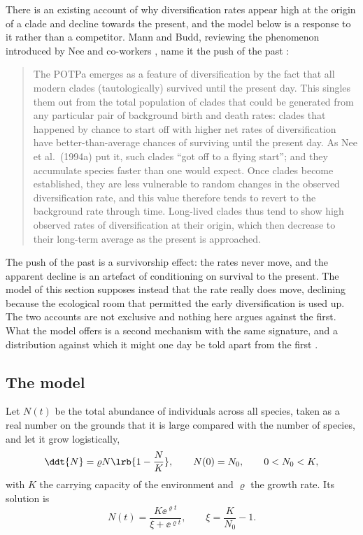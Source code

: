 There is an existing account of why diversification rates appear high at the
origin of a clade and decline towards the present, and the model below is a
response to it rather than a competitor. Mann and Budd, reviewing the
phenomenon introduced by Nee and co-workers \cite{Nee1994}, name it the push
of the past \cite{budd2018history}:

\begin{quotation}
\noindent
The POTPa emerges as a feature of diversification by the fact that all modern
clades (tautologically) survived until the present day. This singles them out
from the total population of clades that could be generated from any
particular pair of background birth and death rates: clades that happened by
chance to start off with higher net rates of diversification have
better-than-average chances of surviving until the present day. As Nee et
al.\ (1994a) put it, such clades ``got off to a flying start''; and they
accumulate species faster than one would expect. Once clades become
established, they are less vulnerable to random changes in the observed
diversification rate, and this value therefore tends to revert to the
background rate through time. Long-lived clades thus tend to show high
observed rates of diversification at their origin, which then decrease to
their long-term average as the present is approached.
\end{quotation}

\noindent
The push of the past is a survivorship effect: the rates never move, and the
apparent decline is an artefact of conditioning on survival to the present.
The model of this section supposes instead that the rate really does move,
declining because the ecological room that permitted the early
diversification is used up. The two accounts are not exclusive and nothing
here argues against the first. What the model offers is a second mechanism
with the same signature, and a distribution against which it might one day be
told apart from the first \cite{bak1991self}.

\subsection{The model}
\label{var:sec:speciationmodel}

Let $N(t)$ be the total abundance of individuals across all species, taken as
a real number on the grounds that it is large compared with the number of
species, and let it grow logistically,
\begin{equation}
\ddt{N}=\varrho N\lrb{1-\frac{N}{K}},
\qquad N(0)=N_0,\qquad 0<N_0<K,
\label{var:eq:logistic}
\end{equation}
with $K$ the carrying capacity of the environment and $\varrho$ the growth
rate. Its solution is
\begin{equation}
N(t)=\frac{K\ee^{\varrho t}}{\xi+\ee^{\varrho t}},
\qquad
\xi=\frac{K}{N_0}-1.
\label{var:eq:logisticsol}
\end{equation}

